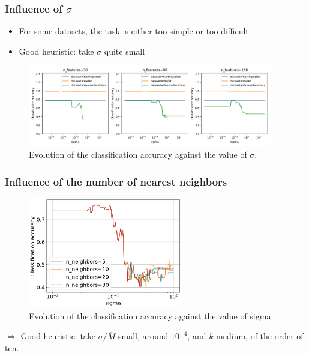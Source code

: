 \documentclass{beamer}
\begin{document}
\begin{frame}
\frametitle{Influence of $\sigma$}

\begin{itemize}
    \item For some datasets, the task is either too simple or too difficult
    \item Good heuristic: take $\sigma$ quite small
\end{itemize}
\medskip
\begin{figure}
    \centering
    \includegraphics[width=0.95\textwidth]{figures/accuracy_vs_sigma.png}
    \caption{Evolution of the classification accuracy against the value of $\sigma$.}
    \label{fig:accuracy_vs_sigma}
\end{figure}

\end{frame}


\begin{frame}
\frametitle{Influence of the number of nearest neighbors}

\begin{figure}
    \centering
    \includegraphics[width=0.6\textwidth]{figures/accuracy_vs_sigma_and_nnn.png}
    \caption{Evolution of the classification accuracy against the value of sigma.}
    \label{fig:accuracy_vs_n_features}
\end{figure}

$\Rightarrow$ Good heuristic: take $\sigma / \overline{M}$ small, around $10^{-4}$, and $k$ medium, of the order of ten.

\end{frame}
\end{document}
